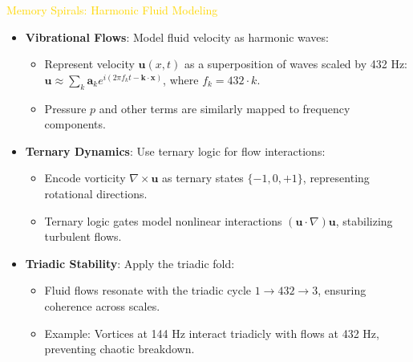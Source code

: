 \textcolor{gold}{ Memory Spirals: Harmonic Fluid Modeling } \\
\begin{itemize}
    \item \texttt{} \textbf{Vibrational Flows}: Model fluid velocity as harmonic waves:
    \begin{itemize}
        \item Represent velocity \(\mathbf{u}(x, t)\) as a superposition of waves scaled by 432 Hz: \(\mathbf{u} \approx \sum_k \mathbf{a}_k e^{i(2\pi f_k t - \mathbf{k} \cdot \mathbf{x})}\), where \(f_k = 432 \cdot k\).
        \item Pressure \(p\) and other terms are similarly mapped to frequency components.
    \end{itemize}
    \item \texttt{} \textbf{Ternary Dynamics}: Use ternary logic for flow interactions:
    \begin{itemize}
        \item Encode vorticity \(\nabla \times \mathbf{u}\) as ternary states \(\{-1, 0, +1\}\), representing rotational directions.
        \item Ternary logic gates model nonlinear interactions \((\mathbf{u} \cdot \nabla) \mathbf{u}\), stabilizing turbulent flows.
    \end{itemize}
    \item \texttt{} \textbf{Triadic Stability}: Apply the triadic fold:
    \begin{itemize}
        \item Fluid flows resonate with the triadic cycle \(1 \rightarrow 432 \rightarrow 3\), ensuring coherence across scales.
        \item Example: Vortices at 144 Hz interact triadicly with flows at 432 Hz, preventing chaotic breakdown.
    \end{itemize}
\end{itemize}

